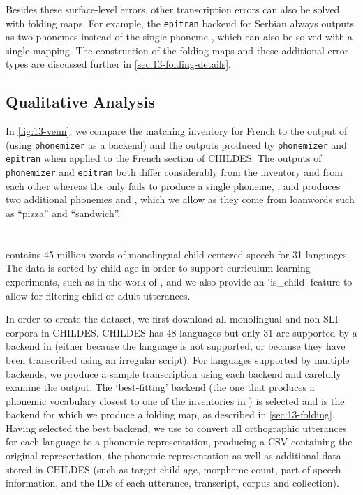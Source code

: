 Besides these surface-level errors, other transcription errors can also be solved with folding maps. For example, the \texttt{epitran} backend for Serbian always outputs  as two phonemes instead of the single phoneme , which can also be solved with a single mapping. The construction of the folding maps and these additional error types are discussed further in \cref{sec:13-folding-details}. 

\subsection{Qualitative Analysis}\label{sec:13-qualitative}

In \cref{fig:13-venn}, we compare the matching \phoible inventory for French to the output of \gpp (using \texttt{phonemizer} as a backend) and the outputs produced by \texttt{phonemizer} and \texttt{epitran} when applied to the French section of CHILDES. The outputs of \texttt{phonemizer} and \texttt{epitran} both differ considerably from the inventory and from each other whereas the \gpp only fails to produce a single phoneme, \ttipa{\textturnh}, and produces two additional phonemes  and , which we allow as they come from loanwords such as ``pizza'' and ``sandwich''. 

\section{\ipachildes}

\ipachildes contains 45 million words of monolingual child-centered speech for 31 languages. The data is sorted by child age in order to support curriculum learning experiments, such as in the work of \citet{huebner-etal-2021-babyberta}, and we also provide an `is\_child' feature to allow for filtering child or adult utterances.

In order to create the dataset, we first download all monolingual and non-SLI corpora in CHILDES. %
CHILDES has 48 languages but only 31 are supported by a backend in \gpp (either because the language is not supported, or because they have been transcribed using an irregular script). For languages supported by multiple backends, we produce a sample transcription using each backend and carefully examine the output. The `best-fitting' backend (the one that produces a phonemic vocabulary closest to one of the inventories in \phoible) is selected and is the backend for which we produce a folding map, as described in \cref{sec:13-folding}. Having selected the best backend, we use \gpp to convert all orthographic utterances for each language to a phonemic representation, producing a CSV containing the original representation, the phonemic representation as well as additional data stored in CHILDES (such as target child age, morpheme count, part of speech information, and the IDs of each utterance, transcript, corpus and collection). 

